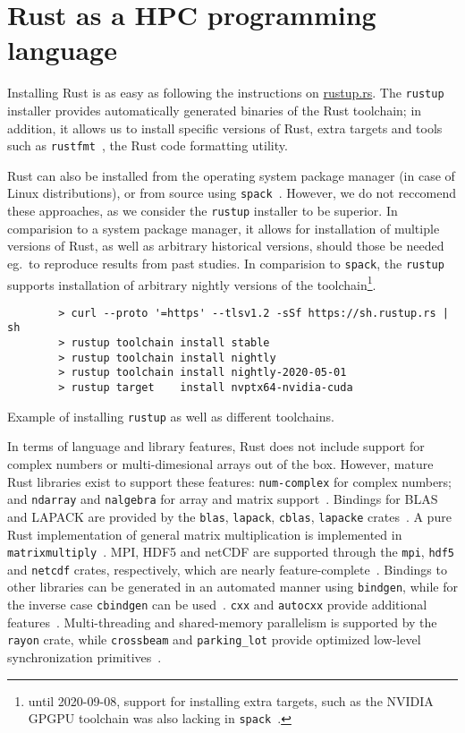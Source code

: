 \documentclass[british]{scrreprt}
\begin{document}
\section{Rust as a HPC programming language}

Installing Rust is as easy as following the instructions on \url{rustup.rs}. The \texttt{rustup}~\cite{rustup} installer provides automatically generated binaries of the Rust toolchain; in addition, it allows us to install specific versions of Rust, extra targets and tools such as \texttt{rustfmt}~\cite{rustfmt}, the Rust code formatting utility.

Rust can also be installed from the operating system package manager (in case of Linux distributions), or from source using \texttt{spack}~\cite{spack}. However, we do not reccomend these approaches, as we consider the \texttt{rustup} installer to be superior. In comparision to a system package manager, it allows for installation of multiple versions of Rust, as well as arbitrary historical versions, should those be needed eg.\ to reproduce results from past studies. In comparision to \texttt{spack}, the \texttt{rustup} supports installation of arbitrary nightly versions of the toolchain\footnote{until 2020-09-08, support for installing extra targets, such as the NVIDIA GPGPU toolchain was also lacking in \texttt{spack}~\cite{SudwojRustaddednvptx}.}.

\begin{listing}
	\centering
	\begin{verbatim}
		> curl --proto '=https' --tlsv1.2 -sSf https://sh.rustup.rs | sh
		> rustup toolchain install stable
		> rustup toolchain install nightly
		> rustup toolchain install nightly-2020-05-01
		> rustup target    install nvptx64-nvidia-cuda
	\end{verbatim}
	\caption{Example of installing \texttt{rustup} as well as different toolchains.}
\end{listing}

In terms of language and library features, Rust does not include support for complex numbers or multi-dimesional arrays out of the box. However, mature Rust libraries exist to support these features: \texttt{num-complex} for complex numbers; and \texttt{ndarray} and \texttt{nalgebra} for array and matrix support~\cite{num-complex,ndarray,nalgebra}. Bindings for BLAS and LAPACK are provided by the \texttt{blas}, \texttt{lapack}, \texttt{cblas}, \texttt{lapacke} crates~\cite{blas-lapack-rs}. A pure Rust implementation of general matrix multiplication is implemented in \texttt{matrixmultiply}~\cite{matrixmultiply}. MPI, HDF5 and netCDF are supported through the \texttt{mpi}, \texttt{hdf5} and \texttt{netcdf} crates, respectively, which are nearly feature-complete~\cite{mpi,hdf5,netcdf}. Bindings to other libraries can be generated in an automated manner using \texttt{bindgen}, while for the inverse case \texttt{cbindgen} can be used~\cite{bindgen,cbindgen}. \texttt{cxx} and \texttt{autocxx} provide additional features~\cite{cxx,autocxx}. Multi-threading and shared-memory parallelism is supported by the \texttt{rayon} crate, while \texttt{crossbeam} and \texttt{parking\_lot} provide optimized low-level synchronization primitives~\cite{rayon,crossbeam,parking-lot}.
\end{document}
